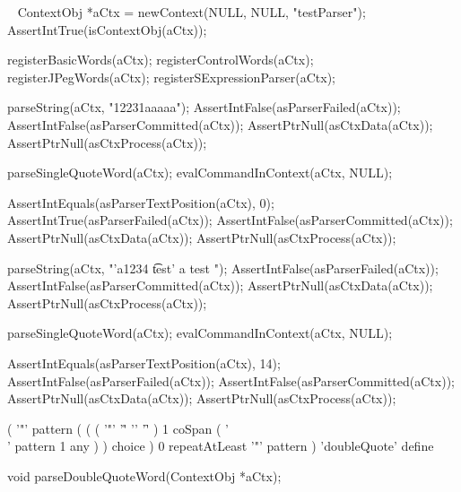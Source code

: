 \CTestsSuiteSetup\
\startCTest
  ContextObj *aCtx = newContext(NULL, NULL, "testParser");
  AssertIntTrue(isContextObj(aCtx));
  
  registerBasicWords(aCtx);
  registerControlWords(aCtx);
  registerJPegWords(aCtx);
  registerSExpressionParser(aCtx);
\stopCTest

\startCTest
  parseString(aCtx, "12231aaaaa");
  AssertIntFalse(asParserFailed(aCtx));
  AssertIntFalse(asParserCommitted(aCtx));
  AssertPtrNull(asCtxData(aCtx));
  AssertPtrNull(asCtxProcess(aCtx));

  parseSingleQuoteWord(aCtx);
  evalCommandInContext(aCtx, NULL);
  
  AssertIntEquals(asParserTextPosition(aCtx), 0);
  AssertIntTrue(asParserFailed(aCtx));
  AssertIntFalse(asParserCommitted(aCtx));
  AssertPtrNull(asCtxData(aCtx));
  AssertPtrNull(asCtxProcess(aCtx));
\stopCTest
\stopTestCase

\startCTest
  parseString(aCtx, "'a1234 \t test' a test ");
  AssertIntFalse(asParserFailed(aCtx));
  AssertIntFalse(asParserCommitted(aCtx));
  AssertPtrNull(asCtxData(aCtx));
  AssertPtrNull(asCtxProcess(aCtx));
  
  parseSingleQuoteWord(aCtx);
  evalCommandInContext(aCtx, NULL);
  
  AssertIntEquals(asParserTextPosition(aCtx), 14);
  AssertIntFalse(asParserFailed(aCtx));
  AssertIntFalse(asParserCommitted(aCtx));
  AssertPtrNull(asCtxData(aCtx));
  AssertPtrNull(asCtxProcess(aCtx));
\stopCTest
\stopTestCase
\stopTestSuite

\startTestSuite[parseDoubleQuoteWord]

\starttyping
(
  '"' pattern
  ( 
    (
      ( '"' '\r' '\n' '\f' ) 1 coSpan
      ( '\\' pattern 1 any )
    ) choice
  ) 0 repeatAtLeast
  '"' pattern
) 'doubleQuote' define
\stoptyping

\startCHeader
void parseDoubleQuoteWord(ContextObj *aCtx);
\stopCHeader

